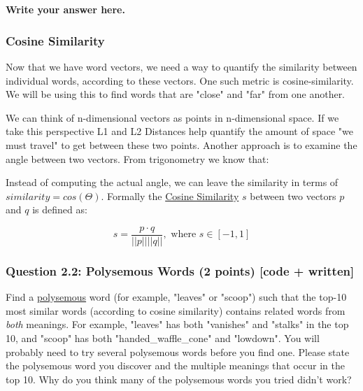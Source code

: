 \documentclass[11pt]{article}
\begin{document}
    \begin{center}
    \end{center}
    { \hspace*{\fill} \\}
    
    \paragraph{Write your answer here.}\label{write-your-answer-here.}

    \subsubsection{Cosine Similarity}\label{cosine-similarity}

Now that we have word vectors, we need a way to quantify the similarity
between individual words, according to these vectors. One such metric is
cosine-similarity. We will be using this to find words that are "close"
and "far" from one another.

We can think of n-dimensional vectors as points in n-dimensional space.
If we take this perspective L1 and L2 Distances help quantify the amount
of space "we must travel" to get between these two points. Another
approach is to examine the angle between two vectors. From trigonometry
we know that:

Instead of computing the actual angle, we can leave the similarity in
terms of \(similarity = cos(\Theta)\). Formally the
\href{https://en.wikipedia.org/wiki/Cosine_similarity}{Cosine
Similarity} \(s\) between two vectors \(p\) and \(q\) is defined as:

\[s = \frac{p \cdot q}{||p|| ||q||}, \textrm{ where } s \in [-1, 1] \]

    \subsubsection{Question 2.2: Polysemous Words (2 points) {[}code +
written{]}}\label{question-2.2-polysemous-words-2-points-code-written}

Find a \href{https://en.wikipedia.org/wiki/Polysemy}{polysemous} word
(for example, "leaves" or "scoop") such that the top-10 most similar
words (according to cosine similarity) contains related words from
\emph{both} meanings. For example, "leaves" has both "vanishes" and
"stalks" in the top 10, and "scoop" has both "handed\_waffle\_cone" and
"lowdown". You will probably need to try several polysemous words before
you find one. Please state the polysemous word you discover and the
multiple meanings that occur in the top 10. Why do you think many of the
polysemous words you tried didn't work?
\end{document}
